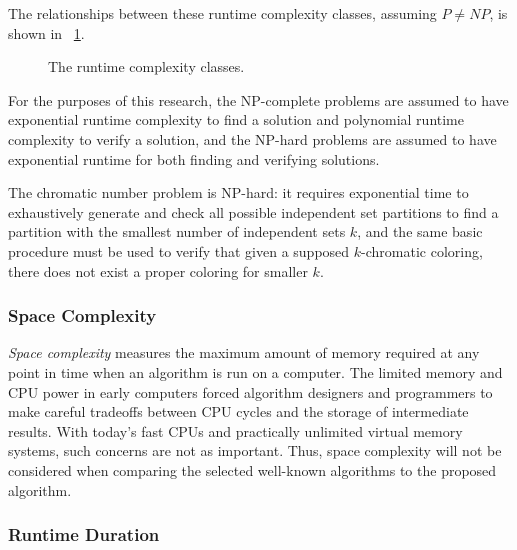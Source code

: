 The relationships between these runtime complexity classes, assuming \(P\ne NP\), is shown in
\figurename~\ref{fig:complexity}.

\begin{figure}[H]
  \centering
  \caption{The runtime complexity classes.}
  \label{fig:complexity}
\end{figure}

For the purposes of this research, the NP-complete problems are assumed to have exponential runtime complexity to
find a solution and polynomial runtime complexity to verify a solution, and the NP-hard problems are assumed to
have exponential runtime for both finding and verifying solutions.

The chromatic number problem is NP-hard: it requires exponential time to exhaustively generate and check all
possible independent set partitions to find a partition with the smallest number of independent sets \(k\), and the
same basic procedure must be used to verify that given a supposed \(k\)-chromatic coloring, there does not exist a
proper coloring for smaller \(k\).

\subsubsection{Space Complexity}\label{sec:sub:sub:space}

\emph{Space complexity} measures the maximum amount of memory required at any point in time when an algorithm is
run on a computer.  The limited memory and CPU power in early computers forced algorithm designers and programmers
to make careful tradeoffs between CPU cycles and the storage of intermediate results.  With today's fast CPUs and
practically unlimited virtual memory systems, such concerns are not as important.  Thus, space complexity will not
be considered when comparing the selected well-known algorithms to the proposed algorithm.

\subsubsection{Runtime Duration}\label{sec:sub:sub:duration}

